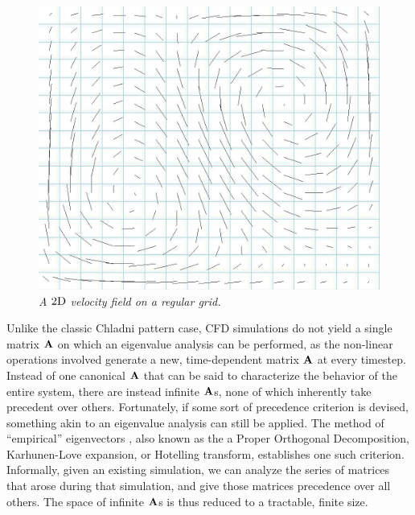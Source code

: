 \documentclass[11pt]{article}
\begin{document}
\begin{figure}
		\centering
		\includegraphics[height=0.3\textwidth]{Figures/velocity_field.png}
		\caption{\em A $2\textnormal{D}$ velocity field on a regular grid.}
		\label{fig:velocity-field}
\end{figure}

Unlike the classic Chladni pattern case, CFD simulations do not yield a single matrix $\mathbf{A}$ on which an eigenvalue analysis can be performed, as the non-linear operations involved generate a new, time-dependent matrix $\mathbf{A}$ at every timestep. Instead of one canonical $\mathbf{A}$ that can be said to characterize the behavior of the entire system, there are instead infinite $\mathbf{A}$s, none of which inherently take precedent over others. Fortunately, if some sort of precedence criterion is devised, something akin to an eigenvalue analysis can still be applied.
The method of ``empirical'' eigenvectors \cite{Ryckelynck2005}, also known as the a Proper Orthogonal Decomposition, Karhunen-Love expansion, or Hotelling transform, establishes one such criterion. Informally, given an existing simulation, we can analyze the series of matrices that arose during that simulation, and give those matrices precedence over all others. The space of infinite $\mathbf{A}$s is thus reduced to a tractable, finite size.


\end{document}
